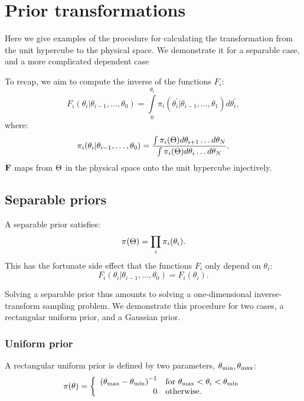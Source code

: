 \section{Prior transformations}
\label{sec:pc:prior_transformations}
Here we give examples of the procedure for calculating the transformation from the unit hypercube to the physical space. We demonstrate it for a separable case, and a more complicated dependent case

To recap, we aim to compute the inverse of the functions $F_i$: 
\begin{equation}
  F_i(\theta_i|\theta_{i-1},\ldots,\theta_0) = \int\limits_0^{\theta_i} \pi_i(\theta_i^\prime|\theta_{i-1},\ldots,\theta_1) d\theta_i^\prime,
  \label{eqn:pc:appFi}
\end{equation}
%
where:
%
\begin{equation}
  \pi_i(\theta_i|\theta_{i-1},\ldots,\theta_0) 
  =
  \frac{%
    \int \pi_i(\params) d\theta_{i+1}\ldots d\theta_{N}
  }{%
    \int \pi_i(\params) d\theta_{i}\ldots d\theta_{N}
  }.
  \label{eqn:pc:apppii}
\end{equation}
$\mathbf{F}$ maps from $\Theta$ in the physical space onto the unit hypercube injectively. 



\subsection{Separable priors}
\label{sec:pc:separable_priors}
A separable prior satisfies:
\begin{equation}
  \pi(\Theta) = \prod_i\pi_i(\theta_i).
  \label{eqn:pc:separability}
\end{equation}
This has the fortunate side effect that the functions $F_i$ only depend on $\theta_i$:
\begin{equation}
  F_i(\theta_i|\theta_{i-1},\ldots,\theta_0) = F_i(\theta_i).
\end{equation}

Solving a separable prior thus amounts to solving a one-dimensional inverse-transform sampling problem. We demonstrate this procedure for two cases, a rectangular uniform prior, and a Gaussian prior.

\subsubsection{Uniform prior}
\label{sec:pc:uniform_prior}
\newcommand{\thetamin}{\theta_\smin} %
\newcommand{\thetamax}{\theta_\smax} %
A rectangular uniform prior is defined by two parameters, ${\thetamin,\thetamax}$:
\begin{equation}
  \pi(\theta) = 
  \left\{
    \begin{array}{rl}
      {(\thetamax - \thetamin)}^{-1} 
      &
      \text{for }\thetamax<\theta_i<\thetamin \\
      0 & \text{otherwise.}
    \end{array}
  \right.
\label{eqn:pc:uniform_prior}
\end{equation}

